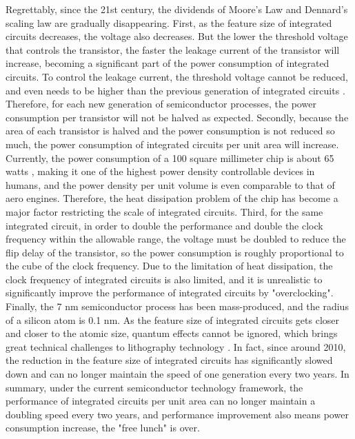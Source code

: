 Regrettably, since the 21st century, the dividends of Moore's Law and Dennard's scaling law are gradually disappearing. First, as the feature size of integrated circuits decreases, the voltage also decreases. But the lower the threshold voltage that controls the transistor, the faster the leakage current of the transistor will increase, becoming a significant part of the power consumption of integrated circuits. To control the leakage current, the threshold voltage cannot be reduced, and even needs to be higher than the previous generation of integrated circuits \cite{borkar1999design}. Therefore, for each new generation of semiconductor processes, the power consumption per transistor will not be halved as expected. Secondly, because the area of each transistor is halved and the power consumption is not reduced so much, the power consumption of integrated circuits per unit area will increase. Currently, the power consumption of a 100 square millimeter chip is about 65 watts \cite{borkar2011future}, making it one of the highest power density controllable devices in humans, and the power density per unit volume is even comparable to that of aero engines. Therefore, the heat dissipation problem of the chip has become a major factor restricting the scale of integrated circuits. Third, for the same integrated circuit, in order to double the performance and double the clock frequency within the allowable range, the voltage must be doubled to reduce the flip delay of the transistor, so the power consumption is roughly proportional to the cube of the clock frequency. Due to the limitation of heat dissipation, the clock frequency of integrated circuits is also limited, and it is unrealistic to significantly improve the performance of integrated circuits by "overclocking". Finally, the 7 nm semiconductor process has been mass-produced, and the radius of a silicon atom is 0.1 nm. As the feature size of integrated circuits gets closer and closer to the atomic size, quantum effects cannot be ignored, which brings great technical challenges to lithography technology \cite{borkar2011future}. In fact, since around 2010, the reduction in the feature size of integrated circuits has significantly slowed down and can no longer maintain the speed of one generation every two years. In summary, under the current semiconductor technology framework, the performance of integrated circuits per unit area can no longer maintain a doubling speed every two years, and performance improvement also means power consumption increase, the "free lunch" is over.

